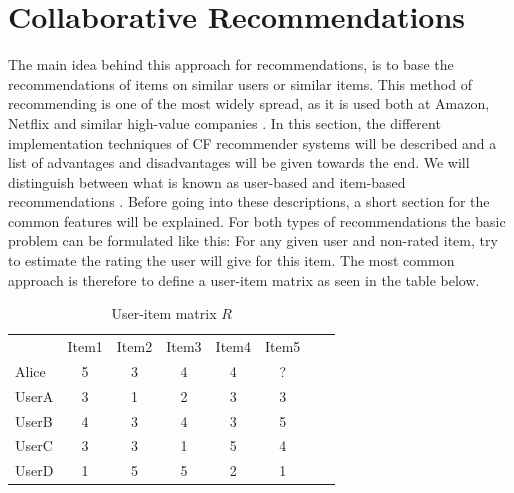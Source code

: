 \section{Collaborative Recommendations}
\label{sec:collaborative}
The main idea behind this approach for recommendations, is to base the recommendations of items on similar users or similar items.\newline
This method of recommending is one of the most widely spread, as it is used both at Amazon, Netflix and similar high-value companies \citep{AmazonRecommendations}.\newline
In this section, the different implementation techniques of CF recommender systems will be described and a list of advantages and disadvantages will be given towards the end. We will distinguish between what is known as user-based and item-based recommendations \citep{IntroductionRecommenderSystems}. Before going into these descriptions, a short section for the common features will be explained.\newline
For both types of recommendations the basic problem can be formulated like this: For any given user and non-rated item, try to estimate the rating the user will give for this item.\newline
The most common approach is therefore to define a user-item matrix as seen in the table below.


\begin{table}[H]
\begin{center}
\begin{tabular}{l c c c c c c r }
  & Item1 & Item2 & Item3 & Item4 & Item5 \\ 
 Alice & 5 & 3 & 4 & 4 & ? \\
 UserA & 3 & 1 & 2 & 3 & 3 \\
 UserB & 4 & 3 & 4 & 3 & 5 \\
 UserC & 3 & 3 & 1 & 5 & 4 \\
 UserD & 1 & 5 & 5 & 2 & 1
\end{tabular}
\caption{User-item matrix \(R\)}
\label{tableofratings} 
\end{center}
\end{table}


